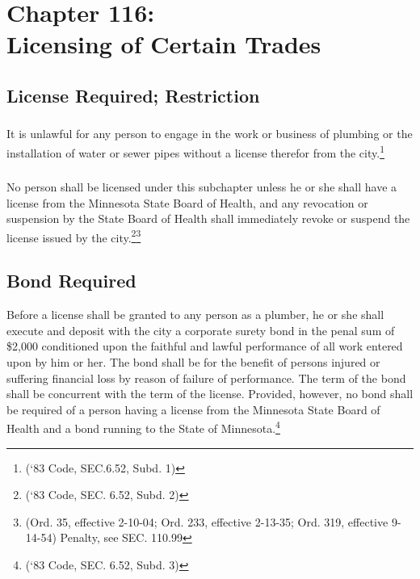 \chapter*{Chapter 116: \\
	Licensing of Certain Trades}
    \vfill
    \minitoc
    \pagebreak


\section{License Required; Restriction}
\subsection{}
It is unlawful for any person to engage in the work or business of plumbing or the installation of water or sewer pipes without a license therefor from the city.\footnote{(‘83 Code, SEC.6.52, Subd. 1)}
\subsection{}
No person shall be licensed under this subchapter unless he or she shall have a license from the Minnesota State Board of Health, and any revocation or suspension by the State Board of Health shall immediately revoke or suspend the license issued by the city.\footnote{(‘83 Code, SEC. 6.52, Subd. 2)}\footnote{(Ord. 35, effective 2-10-04; Ord. 233, effective 2-13-35; Ord. 319, effective 9-14-54)  Penalty, see SEC. 110.99}

\section{Bond Required}
Before a license shall be granted to any person as a plumber, he or she shall execute and deposit with the city a corporate surety bond in the penal sum of \$2,000 conditioned upon the faithful and lawful performance of all work entered upon by him or her. The bond shall be for the benefit of persons injured or suffering financial loss by reason of failure of performance. The term of the bond shall be concurrent with the term of the license. Provided, however, no bond shall be required of a person having a license from the Minnesota State Board of Health and a bond running to the State of Minnesota.\footnote{(‘83 Code, SEC. 6.52, Subd. 3)}

